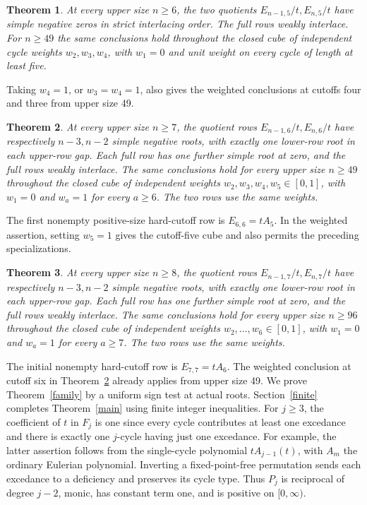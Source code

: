 \documentclass[11pt]{article}
\newtheorem{theorem}{Theorem}
\begin{document}
\begin{theorem}\label{five}
At every upper size \(n\ge6\), the two quotients \(E_{n-1,5}/t,E_{n,5}/t\) have simple negative zeros in strict interlacing order. The full rows weakly interlace. For \(n\ge49\) the same conclusions hold throughout the closed cube of independent cycle weights \(w_2,w_3,w_4\), with \(w_1=0\) and unit weight on every cycle of length at least five.
\end{theorem}
Taking \(w_4=1\), or \(w_3=w_4=1\), also gives the weighted conclusions at cutoffs four and three from upper size 49.
\begin{theorem}\label{six}
At every upper size \(n\ge7\), the quotient rows \(E_{n-1,6}/t,E_{n,6}/t\) have respectively \(n-3,n-2\) simple negative roots, with exactly one lower-row root in each upper-row gap. Each full row has one further simple root at zero, and the full rows weakly interlace. The same conclusions hold for every upper size \(n\ge49\) throughout the closed cube of independent weights \(w_2,w_3,w_4,w_5\in[0,1]\), with \(w_1=0\) and \(w_a=1\) for every \(a\ge6\). The two rows use the same weights.
\end{theorem}
The first nonempty positive-size hard-cutoff row is \(E_{6,6}=tA_5\). In the weighted assertion, setting \(w_5=1\) gives the cutoff-five cube and also permits the preceding specializations.
\begin{theorem}\label{seven}
At every upper size \(n\ge8\), the quotient rows \(E_{n-1,7}/t,E_{n,7}/t\) have respectively \(n-3,n-2\) simple negative roots, with exactly one lower-row root in each upper-row gap. Each full row has one further simple root at zero, and the full rows weakly interlace. The same conclusions hold for every upper size \(n\ge96\) throughout the closed cube of independent weights \(w_2,\ldots,w_6\in[0,1]\), with \(w_1=0\) and \(w_a=1\) for every \(a\ge7\). The two rows use the same weights.
\end{theorem}
The initial nonempty hard-cutoff row is \(E_{7,7}=tA_6\). The weighted conclusion at cutoff six in Theorem~\ref{six} already applies from upper size 49.
We prove Theorem~\ref{family} by a uniform sign test at actual roots. Section~\ref{finite} completes Theorem~\ref{main} using finite integer inequalities. For \(j\ge3\), the coefficient of \(t\) in \(F_j\) is one since every cycle contributes at least one excedance and there is exactly one \(j\)-cycle having just one excedance. For example, the latter assertion follows from the single-cycle polynomial \(tA_{j-1}(t)\), with \(A_m\) the ordinary Eulerian polynomial. Inverting a fixed-point-free permutation sends each excedance to a deficiency and preserves its cycle type. Thus \(P_j\) is reciprocal of degree \(j-2\), monic, has constant term one, and is positive on \([0,\infty)\).
\end{document}
